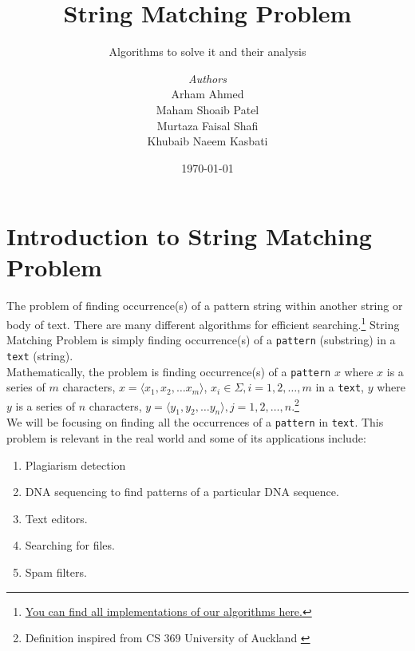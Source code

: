 \documentclass[a4paper, 12pt]{report}
\institute{Habib University}
\title{String Matching Problem}
\subtitle{Algorithms to solve it and their analysis}
\author{\textit{Authors}\\Arham Ahmed \\ Maham Shoaib Patel\\ Murtaza Faisal Shafi\\ Khubaib Naeem Kasbati }
\date{\today}
\begin{document}
    \maketitle
    \romantableofcontents

    \chapter{Introduction to String Matching Problem}

    The problem of finding occurrence(s) of a pattern string within another string or body of text. There are many different algorithms for efficient searching.\footnote{\hyperlink{https://github.com/murtaza854/CS-412-L1-Project-String-Matching}{You can find all implementations of our algorithms here.}}
    String Matching Problem is simply finding occurrence(s) of a \texttt{pattern} (substring) in a \texttt{text} (string). \\
    Mathematically, the problem is finding occurrence(s) of a \texttt{pattern} $x$ where $x$ is a series of $m$ characters, $x = \langle x_1,x_2,\dots x_m \rangle$, $x_i \in \Sigma, i = 1,2,\dots,m$ in a \texttt{text}, $y$ where $y$ is a series of $n$ characters, $y= \langle y_1,y_2,\dots y_n \rangle, j = 1,2,\dots,n$.\footnote{Definition inspired from CS 369 University of Auckland \cite{Gimelfarb}} 
    \\
    We will be focusing on finding all the occurrences of a \texttt{pattern} in \texttt{text}.
    This problem is relevant in the real world and some of its applications include:
    \begin{enumerate}
        \item Plagiarism detection
        \item DNA sequencing to find patterns of a particular DNA sequence.
        \item Text editors.
        \item Searching for files.
        \item Spam filters.
    \end{enumerate}
    

\end{document}
